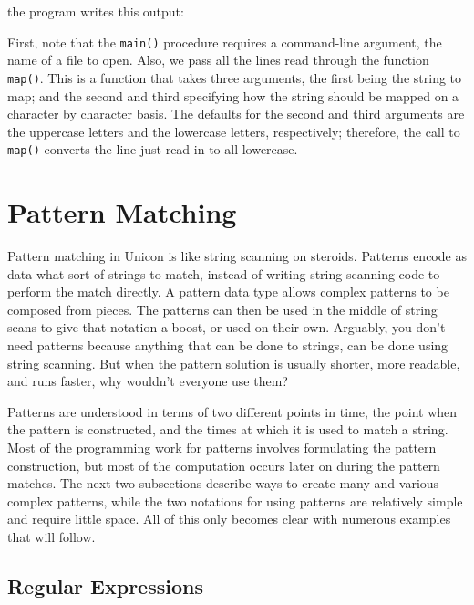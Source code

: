 \noindent the program writes this output:


First, note that the \texttt{main()} procedure requires a command-line
argument, the name of a file to open. Also, we pass all the lines read
through the function \texttt{map()}. This is a function that takes
three arguments, the first being the string to map; and the second and
third specifying how the string should be mapped on a character by
character basis. The defaults for the second and third arguments are
the uppercase letters and the lowercase letters, respectively;
therefore, the call to \texttt{map()} converts the line just read in to
all lowercase.

\section{Pattern Matching}

Pattern matching in Unicon is like string scanning on steroids.
Patterns encode as data what sort of strings to match, instead of writing
string scanning code to perform the match directly.  A
pattern data type allows complex patterns to be composed from pieces.
The patterns can then be used in the middle of string scans to give
that notation a boost, or used on their own. Arguably, you don't need
patterns because anything that can be done to strings, can be done
using string scanning. But when the pattern solution is usually
shorter, more readable, and runs faster, why wouldn't everyone use them?

Patterns are understood in terms of two different points in time, the
point when the pattern is constructed, and the times at which it is
used to match a string.  Most of the programming work for patterns
involves formulating the pattern construction, but most of the
computation occurs later on during the pattern matches.
The next two subsections describe ways to
create many and various complex patterns, while the two notations for
using patterns are relatively simple and require little space.  All of
this only becomes clear with numerous examples that will follow.


\subsection{Regular Expressions}


